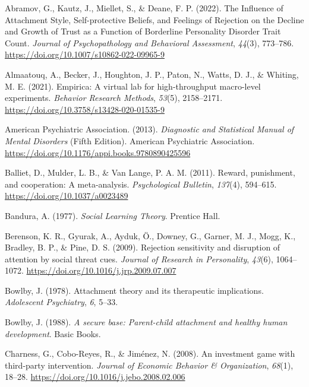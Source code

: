 \documentclass[
]{article}
\newlength{\cslhangindent}
\newenvironment{CSLReferences}[2] %
 {\begin{list}{}{%
  \setlength{\itemindent}{0pt}
  \setlength{\leftmargin}{0pt}
  \setlength{\parsep}{0pt}
  \ifodd #1
   \setlength{\leftmargin}{\cslhangindent}
   \setlength{\itemindent}{-1\cslhangindent}
  \fi
  \setlength{\itemsep}{#2\baselineskip}}}
 {\end{list}}
\begin{document}
\label{refs}
\begin{CSLReferences}{1}{0}
Abramov, G., Kautz, J., Miellet, S., \& Deane, F. P. (2022). The {Influence} of {Attachment Style}, {Self-protective Beliefs}, and {Feelings} of {Rejection} on the {Decline} and {Growth} of {Trust} as a {Function} of {Borderline Personality Disorder Trait Count}. \emph{Journal of Psychopathology and Behavioral Assessment}, \emph{44}(3), 773--786. \url{https://doi.org/10.1007/s10862-022-09965-9}

Almaatouq, A., Becker, J., Houghton, J. P., Paton, N., Watts, D. J., \& Whiting, M. E. (2021). Empirica: A virtual lab for high-throughput macro-level experiments. \emph{Behavior Research Methods}, \emph{53}(5), 2158--2171. \url{https://doi.org/10.3758/s13428-020-01535-9}

American Psychiatric Association. (2013). \emph{Diagnostic and {Statistical Manual} of {Mental Disorders}} (Fifth Edition). American Psychiatric Association. \url{https://doi.org/10.1176/appi.books.9780890425596}

Balliet, D., Mulder, L. B., \& Van Lange, P. A. M. (2011). Reward, punishment, and cooperation: {A} meta-analysis. \emph{Psychological Bulletin}, \emph{137}(4), 594--615. \url{https://doi.org/10.1037/a0023489}

Bandura, A. (1977). \emph{Social {Learning Theory}}. Prentice Hall.

Berenson, K. R., Gyurak, A., Ayduk, Ö., Downey, G., Garner, M. J., Mogg, K., Bradley, B. P., \& Pine, D. S. (2009). Rejection sensitivity and disruption of attention by social threat cues. \emph{Journal of Research in Personality}, \emph{43}(6), 1064--1072. \url{https://doi.org/10.1016/j.jrp.2009.07.007}

Bowlby, J. (1978). Attachment theory and its therapeutic implications. \emph{Adolescent Psychiatry}, \emph{6}, 5--33.

Bowlby, J. (1988). \emph{A secure base: Parent-child attachment and healthy human development}. Basic Books.

Charness, G., Cobo-Reyes, R., \& Jiménez, N. (2008). An investment game with third-party intervention. \emph{Journal of Economic Behavior \& Organization}, \emph{68}(1), 18--28. \url{https://doi.org/10.1016/j.jebo.2008.02.006}


\end{CSLReferences}
\end{document}

